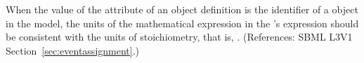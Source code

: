 When the value of the  attribute of an \EventAssignment
object definition is the identifier of a \SpeciesReference object in the
model, the units of the mathematical expression in the \EventAssignment's
 expression should be consistent with the units of
stoichiometry, that is, .  (References: SBML L3V1
Section~\ref{sec:eventassignment}.)
